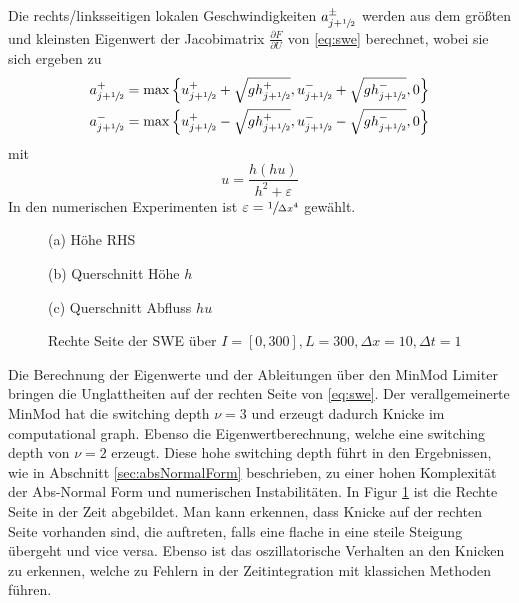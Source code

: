 Die rechts/linksseitigen lokalen Geschwindigkeiten $a^\pm_{j+\sfrac{1}{2}}$ werden aus dem größten und kleinsten Eigenwert der Jacobimatrix $\frac{\partial F}{\partial U}$ von \eqref{eq:swe} berechnet, wobei sie sich ergeben zu
\[
 \begin{aligned}
 a^+_{j+\sfrac{1}{2}} &= \max \left\lbrace u^+_{j+\sfrac{1}{2}} + \sqrt{gh^+_{j+\sfrac{1}{2}}},u^-_{j+\sfrac{1}{2}} + \sqrt{gh^-_{j+\sfrac{1}{2}}},0\right\rbrace\\
 a^-_{j+\sfrac{1}{2}} &= \max \left\lbrace u^+_{j+\sfrac{1}{2}} - \sqrt{gh^+_{j+\sfrac{1}{2}}},u^-_{j+\sfrac{1}{2}} - \sqrt{gh^-_{j+\sfrac{1}{2}}},0\right\rbrace
 \end{aligned}
\]
mit \begin{equation}
u=\frac{h(hu)}{h^2 + \varepsilon}
\label{eq:sweHuToU}
    \end{equation}
In den numerischen Experimenten ist $\varepsilon = \sfrac{1}{\Delta x^4}$ gewählt.
\begin{figure}
\footnotesize
\centering
\begin{minipage}[b]{\linewidth}

\caption*{(a) Höhe RHS}
\end{minipage}
\begin{minipage}[b]{0.49\linewidth}

\caption*{(b) Querschnitt Höhe $h$}
\end{minipage}
\begin{minipage}[b]{0.49\linewidth}

\caption*{(c) Querschnitt Abfluss $hu$}
\end{minipage}
\caption{Rechte Seite der SWE über $I=[0,300], L=300, \Delta x=10, \Delta t = 1$}
\label{fig:sweGrad}
\end{figure}


Die Berechnung der Eigenwerte und der Ableitungen über den MinMod Limiter bringen die Unglattheiten auf der rechten Seite von \eqref{eq:swe}.  Der verallgemeinerte MinMod hat die switching depth $\nu = 3$ und erzeugt dadurch Knicke im computational graph. Ebenso die Eigenwertberechnung, welche eine switching depth von $\nu = 2$ erzeugt. Diese hohe switching depth führt in den Ergebnissen, wie in Abschnitt \ref{sec:absNormalForm} beschrieben, zu einer hohen Komplexität der Abs-Normal Form und numerischen Instabilitäten. In Figur \ref{fig:sweGrad} ist die Rechte Seite in der Zeit abgebildet. Man kann erkennen, dass Knicke auf der rechten Seite vorhanden sind, die auftreten, falls eine flache in eine steile Steigung übergeht und vice versa. Ebenso ist das oszillatorische Verhalten an den Knicken zu erkennen, welche zu Fehlern in der Zeitintegration mit klassichen Methoden führen.

